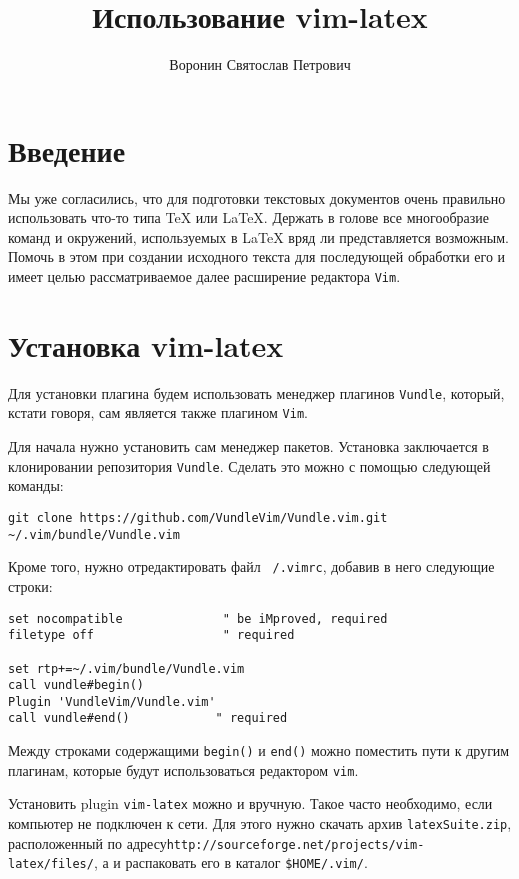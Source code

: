 \documentclass[a4paper]{article}
\author{Воронин Святослав Петрович}
\title{Использование vim-latex}
\begin{document}
\maketitle
\tableofcontents

\part{Введение}
Мы уже согласились, что для подготовки текстовых документов очень правильно
использовать что-то типа \TeX{} или \LaTeX. Держать в голове все многообразие
команд и окружений, используемых в \LaTeX{} вряд ли представляется возможным.
Помочь в этом при создании исходного текста для последующей обработки его 
 и имеет целью рассматриваемое далее расширение редактора \texttt{Vim}.
\part{Установка vim-latex}\label{part:install}
Для установки плагина будем использовать менеджер плагинов \texttt{Vundle}, 
который, кстати говоря, сам является также плагином \texttt{Vim}.

Для начала нужно установить сам менеджер пакетов. Установка заключается в
клонировании репозитория \texttt{Vundle}. Сделать это можно с помощью следующей
команды:
\begin{verbatim}
git clone https://github.com/VundleVim/Vundle.vim.git ~/.vim/bundle/Vundle.vim
\end{verbatim}
Кроме того, нужно отредактировать файл \texttt{~/.vimrc}, добавив в него следующие
строки:
\begin{verbatim}
set nocompatible              " be iMproved, required
filetype off                  " required

set rtp+=~/.vim/bundle/Vundle.vim
call vundle#begin()
Plugin 'VundleVim/Vundle.vim'
call vundle#end()            " required
\end{verbatim}
Между строками содержащими \texttt{begin()} и \texttt{end()} можно поместить 
пути к другим плагинам, которые будут использоваться редактором \texttt{vim}.

Установить plugin \texttt{vim-latex} можно и вручную. Такое часто необходимо, 
если компьютер не подключен к сети. Для этого нужно скачать архив 
\texttt{latexSuite.zip}, расположенный по адресу\linebreak \texttt{http://sourceforge.net/projects/vim-latex/files/},
а и распаковать его в каталог \verb|$HOME/.vim/|. 
\end{document}
